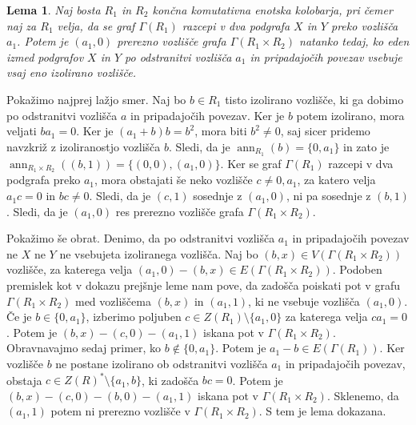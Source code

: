 \documentclass[a4paper, 12pt]{amsart}
\theoremstyle{definition} %
\theoremstyle{plain} %
\newtheorem{lema}[definicija]{Lema}
\DeclareMathOperator{\ann}{ann}
\begin{document}
\begin{lema}
\label{cutVertexProduct}
Naj bosta $R_1$ in $ R_2$ končna komutativna enotska kolobarja, pri čemer naj za $R_1$ velja, da se graf $\Gamma(R_1)$ razcepi v dva podgrafa $X$ in $Y$ preko vozlišča $a_1$. Potem je $(a_1,0) $ prerezno vozlišče grafa $\Gamma(R_1 \times R_2)$ natanko tedaj, ko eden izmed podgrafov $X$ in $Y$ po odstranitvi vozlišča $a_1$ in pripadajočih povezav  vsebuje vsaj eno izolirano vozlišče.
\end{lema}

\proof
Pokažimo najprej lažjo smer. Naj bo $b\in R_1$ tisto izolirano vozlišče, ki ga dobimo po odstranitvi vozlišča $a$ in pripadajočih povezav. Ker je $b$ potem izolirano, mora veljati $ba_1 = 0$. Ker je $(a_1 + b)b = b^2$, mora biti $b^2\neq 0$, saj sicer pridemo navzkriž z izoliranostjo vozlišča $b$. Sledi, da je $\ann_{R_1}(b) = \{0,a_1\}$ in zato je $\ann_{R_1\times R_2}((b,1)) = \{(0,0),(a_1,0)\}$. Ker se graf $\Gamma(R_1)$ razcepi v dva podgrafa preko $a_1$, mora obstajati še neko vozlišče $c\neq 0,a_1$, za katero velja $a_1 c = 0$ in $bc\neq 0$. Sledi, da je $(c,1)$ sosednje z $(a_1,0)$, ni pa sosednje z $(b,1)$. Sledi, da je $(a_1,0)$ res prerezno vozlišče grafa $\Gamma(R_1 \times R_2)$.

Pokažimo še obrat. Denimo, da po odstranitvi vozlišča $a_1$ in pripadajočih povezav ne $X$ ne $Y$ ne vsebujeta izoliranega vozlišča. Naj bo $(b,x)\in V(\Gamma(R_1\times R_2))$ vozlišče, za katerega velja $(a_1,0) -(b,x) \in E(\Gamma(R_1\times R_2))$. Podoben premislek kot v dokazu prejšnje leme nam pove, da zadošča poiskati pot  v grafu $\Gamma(R_1 \times R_2)$ med vozliščema $(b,x)$ in $(a_1,1)$, ki ne vsebuje vozlišča $(a_1,0)$. Če je $b\in \{0,a_1\}$, izberimo poljuben $c\in Z(R_1) \setminus \{a_1,0\}$ za katerega velja $ca_1 = 0$. Potem je $(b,x) - (c,0) - (a_1,1)$ iskana pot v $\Gamma(R_1 \times R_2)$. Obravnavajmo sedaj primer, ko $b\notin \{0,a_1\}$. Potem je $a_1 -b\in E(\Gamma(R_1))$. Ker vozlišče $b$ ne postane izolirano ob odstranitvi vozlišča $a_1$ in pripadajočih povezav, obstaja $c\in Z(R)^*\setminus\{a_1,b\}$, ki zadošča $bc=0$. Potem je $(b,x)-(c,0)-(b,0)-(a_1,1)$ iskana pot v $\Gamma(R_1\times R_2)$. Sklenemo, da $(a_1,1)$ potem ni prerezno vozlišče v $\Gamma(R_1 \times R_2)$. S tem je lema dokazana. 
\endproof
\end{document}
